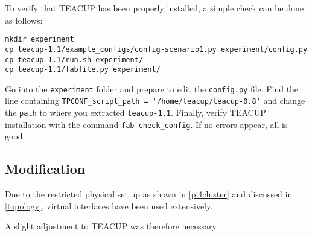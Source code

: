 To verify that TEACUP has been properly installed, a simple check can be done as follows:

\begin{lstlisting}
mkdir experiment
cp teacup-1.1/example_configs/config-scenario1.py experiment/config.py
cp teacup-1.1/run.sh experiment/
cp teacup-1.1/fabfile.py experiment/
\end{lstlisting}

Go into the \lstinline{experiment} folder and prepare to edit the \lstinline{config.py} file. Find the line containing \lstinline{TPCONF_script_path = '/home/teacup/teacup-0.8'} and change the \lstinline{path} to where you extracted \lstinline{teacup-1.1}. Finally, verify TEACUP installation with the command \lstinline{fab check_config}. If no errors appear, all is good.


\subsection{Modification}

Due to the restricted physical set up as shown in \ref{pi4cluster} and discussed in \ref{topology}, virtual interfaces have been used extensively. 

A slight adjustment to TEACUP was therefore necessary.


